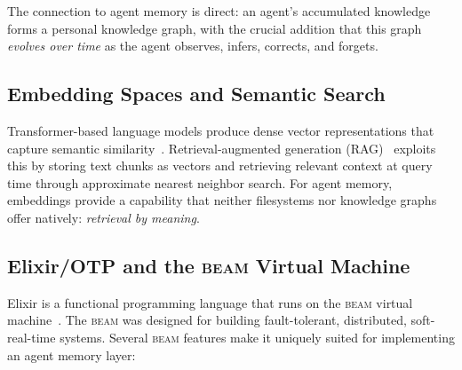 \documentclass[12pt,a4paper]{article}
\theoremstyle{definition}
\newcommand{\BEAM}{\textsc{beam}}
\begin{document}
The connection to agent memory is direct: an agent's accumulated knowledge forms a personal knowledge graph, with the crucial addition that this graph \emph{evolves over time} as the agent observes, infers, corrects, and forgets.

\subsection{Embedding Spaces and Semantic Search}\label{subsec:embeddings}

Transformer-based language models produce dense vector representations that capture semantic similarity~\citep{reimers2019sentence, devlin2019bert}.
Retrieval-augmented generation (RAG)~\citep{lewis2020rag} exploits this by storing text chunks as vectors and retrieving relevant context at query time through approximate nearest neighbor search.
For agent memory, embeddings provide a capability that neither filesystems nor knowledge graphs offer natively: \emph{retrieval by meaning}.

\subsection{Elixir/OTP and the \BEAM{} Virtual Machine}\label{subsec:elixir-otp}

Elixir is a functional programming language that runs on the \BEAM{} virtual machine~\citep{armstrong2013erlang, thomas2018elixir}.
The \BEAM{} was designed for building fault-tolerant, distributed, soft-real-time systems.
Several \BEAM{} features make it uniquely suited for implementing an agent memory layer:
\end{document}
